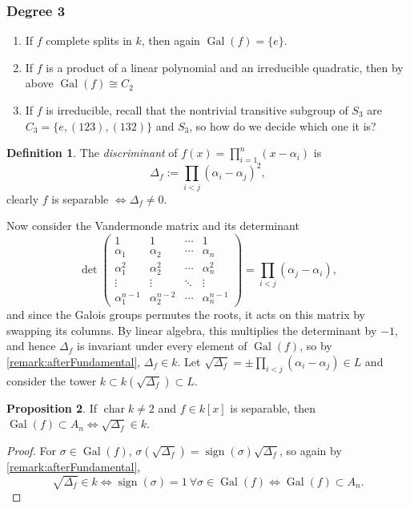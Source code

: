 \documentclass{article}
\newcommand{\Char}{\operatorname{char}}
\newcommand{\Gal}{\operatorname{Gal}}
\newcommand{\sign}{\operatorname{sign}}
\theoremstyle{definition}
\newtheorem{defn}{Definition}[subsection]
\newtheorem{prop}[defn]{Proposition}
\begin{document}
\subsubsection{Degree 3}
\begin{enumerate}
\item If $f$ complete splits in $k$, then again $\Gal(f)=\{e\}$.
\item If $f$ is a product of a linear polynomial and an irreducible quadratic, then by above $\Gal(f)\cong C_2$
\item If $f$ is irreducible, recall that the nontrivial transitive subgroup of $S_3$ are $C_3=\{e,(123),(132)\}$ and $S_3$, so how do we decide which one it is?
\end{enumerate}

\begin{defn}
The \textit{discriminant} of $f(x)=\prod_{i=1}^n (x-\alpha_i)$ is
\[
\Delta_f:=\prod_{i<j}(\alpha_i-\alpha_j)^2,
\]
clearly $f$ is separable $\iff\Delta_f\neq 0$.
\end{defn}

Now consider the Vandermonde matrix and its determinant
\[
\det\begin{pmatrix}
1 & 1 & \cdots & 1 \\
\alpha_1 & \alpha_2 & \cdots & \alpha_n \\
\alpha_1^2 & \alpha_2^2 & \cdots & \alpha_n^2 \\
\vdots & \vdots & \ddots & \vdots \\
\alpha_1^{n-1} & \alpha_2^{n-2} & \cdots & \alpha_n^{n-1} 
\end{pmatrix}=\prod_{i<j}(\alpha_j-\alpha_i),
\]
and since the Galois groups permutes the roots, it acts on this matrix by swapping its columns. By linear algebra, this multiplies the determinant by $-1$, and hence $\Delta_f$ is invariant under every element of $\Gal(f)$, so by \ref{remark:afterFundamental}, $\Delta_f\in k$. Let $\sqrt{\Delta_f}=\pm\prod_{i<j}(\alpha_i-\alpha_j)\in L$ and consider the tower $k\subset k\left(\sqrt{\Delta_f}\right)\subset L$.

\begin{prop}
If $\Char k\neq 2$ and $f\in k[x]$ is separable, then $\Gal(f)\subset A_n\iff \sqrt{\Delta_f}\in k$.
\end{prop}
\begin{proof}
For $\sigma\in\Gal(f)$, $\sigma\left(\sqrt{\Delta_f}\right)=\sign(\sigma)\sqrt{\Delta_f}$, so again by \ref{remark:afterFundamental},
\[
\sqrt{\Delta_f}\in k\iff\sign(\sigma)=1 \ \forall \sigma\in\Gal(f)\iff\Gal(f)\subset A_n.
\]
\end{proof}
\end{document}
